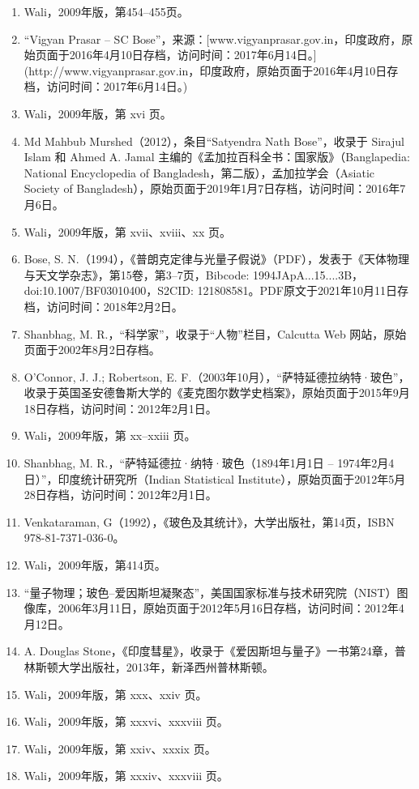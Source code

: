 \begin{enumerate}
\item Wali，2009年版，第454–455页。
\item “Vigyan Prasar – SC Bose”，来源：[www.vigyanprasar.gov.in，印度政府，原始页面于2016年4月10日存档，访问时间：2017年6月14日。](http://www.vigyanprasar.gov.in，印度政府，原始页面于2016年4月10日存档，访问时间：2017年6月14日。)
\item Wali，2009年版，第 xvi 页。
\item Md Mahbub Murshed（2012），条目“Satyendra Nath Bose”，收录于 Sirajul Islam 和 Ahmed A. Jamal 主编的《孟加拉百科全书：国家版》（Banglapedia: National Encyclopedia of Bangladesh，第二版），孟加拉学会（Asiatic Society of Bangladesh），原始页面于2019年1月7日存档，访问时间：2016年7月6日。
\item Wali，2009年版，第 xvii、xviii、xx 页。
\item Bose, S. N.（1994），《普朗克定律与光量子假说》（PDF），发表于《天体物理与天文学杂志》，第15卷，第3–7页，Bibcode: 1994JApA...15....3B，doi:10.1007/BF03010400，S2CID: 121808581。PDF原文于2021年10月11日存档，访问时间：2018年2月2日。
\item Shanbhag, M. R.，“科学家”，收录于“人物”栏目，Calcutta Web 网站，原始页面于2002年8月2日存档。
\item O'Connor, J. J.; Robertson, E. F.（2003年10月），“萨特延德拉纳特·玻色”，收录于英国圣安德鲁斯大学的《麦克图尔数学史档案》，原始页面于2015年9月18日存档，访问时间：2012年2月1日。
\item Wali，2009年版，第 xx–xxiii 页。
\item Shanbhag, M. R.，“萨特延德拉·纳特·玻色（1894年1月1日 – 1974年2月4日）”，印度统计研究所（Indian Statistical Institute），原始页面于2012年5月28日存档，访问时间：2012年2月1日。
\item Venkataraman, G（1992），《玻色及其统计》，大学出版社，第14页，ISBN 978-81-7371-036-0。
\item Wali，2009年版，第414页。
\item “量子物理；玻色–爱因斯坦凝聚态”，美国国家标准与技术研究院（NIST）图像库，2006年3月11日，原始页面于2012年5月16日存档，访问时间：2012年4月12日。
\item A. Douglas Stone，《印度彗星》，收录于《爱因斯坦与量子》一书第24章，普林斯顿大学出版社，2013年，新泽西州普林斯顿。
\item Wali，2009年版，第 xxx、xxiv 页。
\item Wali，2009年版，第 xxxvi、xxxviii 页。
\item Wali，2009年版，第 xxiv、xxxix 页。
\item Wali，2009年版，第 xxxiv、xxxviii 页。

\end{enumerate}
